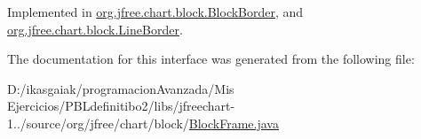 Implemented in \mbox{\hyperlink{classorg_1_1jfree_1_1chart_1_1block_1_1_block_border_a4507b8ff587d8d3f75ffa5e4996e19c2}{org.\+jfree.\+chart.\+block.\+Block\+Border}}, and \mbox{\hyperlink{classorg_1_1jfree_1_1chart_1_1block_1_1_line_border_a9487885ccbfa1805c3912fafd6e27d5e}{org.\+jfree.\+chart.\+block.\+Line\+Border}}.



The documentation for this interface was generated from the following file\+:\begin{DoxyCompactItemize}
\item 
D\+:/ikasgaiak/programacion\+Avanzada/\+Mis Ejercicios/\+P\+B\+Ldefinitibo2/libs/jfreechart-\/1../source/org/jfree/chart/block/\mbox{\hyperlink{_block_frame_8java}{Block\+Frame.\+java}}\end{DoxyCompactItemize}

